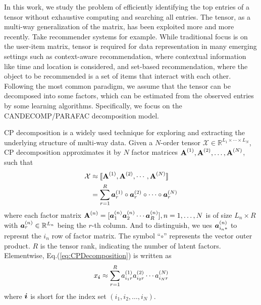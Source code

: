 \documentclass[letterpaper]{article}
\newcommand{\Sca}[3]{{#1}^{(#2)}_{i_#2#3}}%
\newcommand{\anr}[2]{\Sca{a}{#1}{#2}}
\newcommand{\T}[1]{\mathcal{#1}}
\newcommand{\KT}[1]{\llbracket #1 \rrbracket}
\newcommand{\V}[1]{{\boldsymbol{{\MakeLowercase{#1}}}}}
\newcommand{\VnC}[3]{\V{#1}^{(#2)}_{#3}}
\newcommand{\Varow}[1]{\V{a}^{(#1)}_{i_#1*}}
\newcommand{\M}[1]{{\textbf{{\MakeUppercase{#1}}}}}
\newcommand{\Mn}[2]{\M{#1}^{(#2)}}
\newcommand{\Eqn}[1]   {Eq.(\ref{eq:#1})}
\begin{document}
In this work, 
we study the problem of efficiently identifying the top entries of a tensor 
without exhaustive computing and searching all entries. 
The tensor, as a multi-way generalization of the matrix, 
has been exploited more and more recently. 
Take recommender systems for example. 
While traditional focus is on the user-item matrix\cite{KoYe09}, 
tensor\cite{Rendle_PITF,HuYiLa15} is required for data representation in many emerging settings 
such as context-aware recommendation, 
where contextual information like time and location is considered, and set-based recommendation, 
where the object to be recommended is a set of items that interact with each other. 
Following the most common paradigm, we assume that the tensor can be decomposed into some factors, 
which can be estimated from the observed entries by some learning algorithms. 
Specifically, we focus on the CANDECOMP/PARAFAC decomposition model.

CP decomposition\cite{KoBa09} is a widely used technique for exploring and 
extracting the underlying structure of multi-way data. 
Given a $N$-order tensor $\T{X}\in\mathbb{R}^{L_1\times \cdots\times L_N}$, 
CP decomposition approximates it by $N$ factor matrices $\Mn{A}{1},\Mn{A}{2},\ldots,\Mn{A}{N}$, 
such that
\begin{align}
\label{eq:CPDecomposition}
\T{X}&\approx\KT{\Mn{A}{1},\Mn{A}{2},\cdots,\Mn{A}{N}} \\ \notag
&=\sum_{r=1}^R\VnC{a}{1}{r}\circ\VnC{a}{2}{r}\circ\cdots\circ\VnC{a}{N}{r}
\end{align}
where each factor matrix 
$\Mn{A}{n}=[\VnC{a}{n}{1}\VnC{a}{n}{2}\cdots\VnC{a}{n}{R}], n=1,\ldots,N$
is of size $L_n\times R$ with $\VnC{a}{n}{r}\in\mathbb{R}^{L_n}$ 
being the $r$-th column.
And to distinguish, we ues $\Varow{n}$ to represnt the $i_n$ row of factor matrix.
The symbol ``$\circ$'' represents the vector outer product. 
$R$ is the tensor rank, indicating the number of latent factors. 
Elementwise, \Eqn{CPDecomposition} is written as
\begin{align}
\label{eq:CPValue}
x_\V{i} \approx \sum_{r=1}^{R}\anr{1}{r}\anr{2}{r}\cdots\anr{N}{r}
\end{align}
where $\V{i}$ is short for the index set $(i_1,i_2,\ldots,i_N)$.
\end{document}
